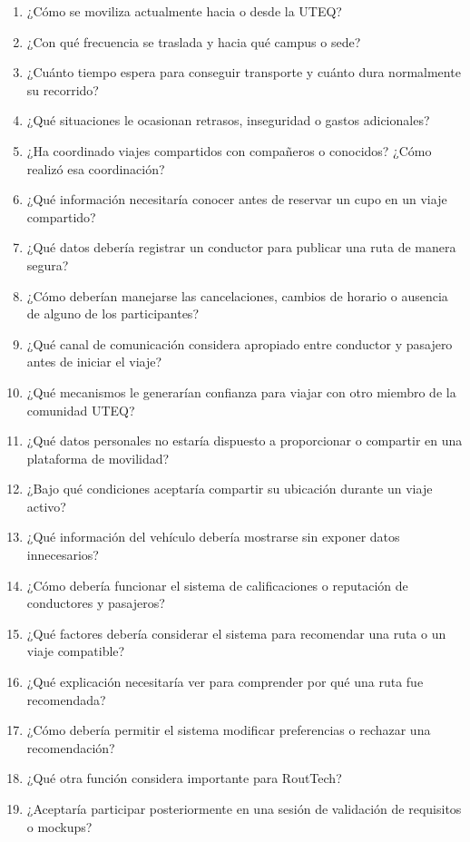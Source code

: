 \documentclass[10pt,a4paper]{article}
\begin{document}
\begin{enumerate}
  \item ¿Cómo se moviliza actualmente hacia o desde la UTEQ?
  \item ¿Con qué frecuencia se traslada y hacia qué campus o sede?
  \item ¿Cuánto tiempo espera para conseguir transporte y cuánto dura normalmente su recorrido?
  \item ¿Qué situaciones le ocasionan retrasos, inseguridad o gastos adicionales?
  \item ¿Ha coordinado viajes compartidos con compañeros o conocidos? ¿Cómo realizó esa coordinación?
  \item ¿Qué información necesitaría conocer antes de reservar un cupo en un viaje compartido?
  \item ¿Qué datos debería registrar un conductor para publicar una ruta de manera segura?
  \item ¿Cómo deberían manejarse las cancelaciones, cambios de horario o ausencia de alguno de los participantes?
  \item ¿Qué canal de comunicación considera apropiado entre conductor y pasajero antes de iniciar el viaje?
  \item ¿Qué mecanismos le generarían confianza para viajar con otro miembro de la comunidad UTEQ?
  \item ¿Qué datos personales no estaría dispuesto a proporcionar o compartir en una plataforma de movilidad?
  \item ¿Bajo qué condiciones aceptaría compartir su ubicación durante un viaje activo?
  \item ¿Qué información del vehículo debería mostrarse sin exponer datos innecesarios?
  \item ¿Cómo debería funcionar el sistema de calificaciones o reputación de conductores y pasajeros?
  \item ¿Qué factores debería considerar el sistema para recomendar una ruta o un viaje compatible?
  \item ¿Qué explicación necesitaría ver para comprender por qué una ruta fue recomendada?
  \item ¿Cómo debería permitir el sistema modificar preferencias o rechazar una recomendación?
  \item ¿Qué otra función considera importante para RoutTech?
  \item ¿Aceptaría participar posteriormente en una sesión de validación de requisitos o mockups?
\end{enumerate}
\end{document}
